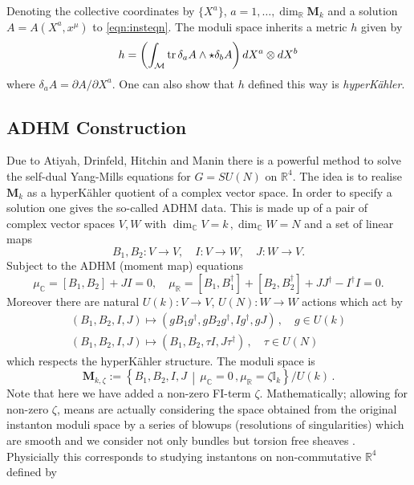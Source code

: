 \documentclass[main.tex]{subfiles}
\begin{document}
Denoting the collective coordinates by $\{X^{a}\}$, $a=1,\dots,\dim_{\mathbb{R}}\mathbf{M}_k$ and a solution $A=A(X^a,x^{\mu})$ to \eqref{eqn:insteqn}.  The moduli space inherits a metric $h$ given by
\begin{equation}
h=\left(\int_{\mathcal{M}}\operatorname{tr} \delta_a A \wedge\star \delta_b A \right) d X^a\otimes d X^b
\end{equation}
where $\delta_a A=\partial A/\partial X^{a}$.  One can also show that $h$ defined this way is \textit{hyperK\"ahler}.
\subsection{ADHM Construction}
Due to Atiyah, Drinfeld, Hitchin and Manin \cite{Atiyah:1978ri} there is a powerful method to solve the self-dual Yang-Mills equations for $G=SU(N)$ on $\mathbb{R}^4$.
The idea is to realise $\mathbf{M}_{k}$ as a hyperK\"ahler quotient of a complex vector space.  In order to specify a solution one gives the so-called ADHM data.  This is made up of a pair of complex vector spaces $V,W$ with $\dim_{\mathbb{C}} V=k\,,\dim_{\mathbb{C}} W=N$ and a set of linear maps
\begin{equation}
B_1,B_2:V\to V,\quad I:V\to W,\quad J:W\to V.
\end{equation} 
Subject to the ADHM (moment map) equations 
\begin{equation}\label{eqn:BPSADHM}
\mu_{\mathbb{C}}=[B_1,B_2]+JI=0,\quad \mu_{\mathbb{R}}=[B_1,B_1^{\dagger}]+[B_2,B_2^{\dagger}]+JJ^{\dagger}-I^{\dagger}I=0.
\end{equation}
Moreover there are natural $U(k):V\to V$, $U(N):W\to W$ actions which act by
\begin{gather}
(B_1,B_2,I,J)\mapsto(gB_1g^{\dagger},gB_2g^{\dagger},Ig^{\dagger},gJ)\,,\quad g\in U(k)\\ (B_1,B_2,I,J)\mapsto(B_1,B_2,\tau I, J\tau^{\dagger})\,,\quad \tau\in U(N)
\end{gather}
which respects the hyperK\"ahler structure.  The moduli space is
\begin{equation}
\mathbf{M}_{k,\zeta}:=\left\{B_1,B_2,I,J\,\middle|\,\mu_{\mathbb{C}}=0\,,\mu_{\mathbb{R}}=\zeta\mathbb{I}_k\right\}/U(k)\,.
\end{equation}
Note that here we have added a non-zero FI-term $\zeta$.  Mathematically; allowing for non-zero $\zeta$, means are actually considering the space obtained from the original instanton moduli space by a series of blowups (resolutions of singularities) which are smooth and we consider not only bundles but torsion free sheaves \cite{nakajima1995heisenberg,Nakajima:2003uh,Nakajima:2003pg,Tachikawa:2014dja,Nekrasov:2002qd,Nekrasov:1998ss}.  Physicially this corresponds to studying instantons on non-commutative $\mathbb{R}^4$  \cite{Nekrasov:1998ss,Seiberg:1999vs} defined by
\end{document}
